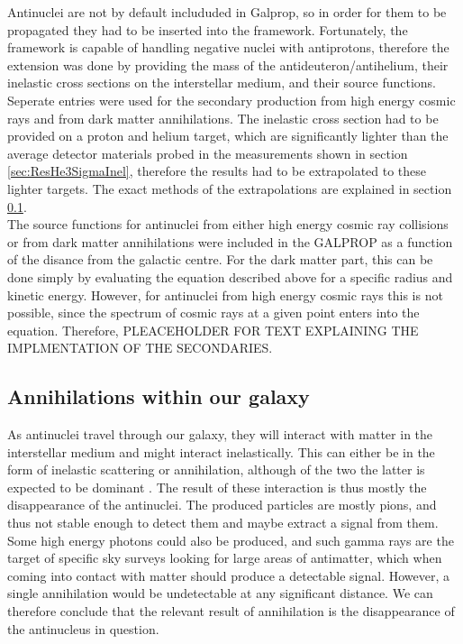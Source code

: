Antinuclei are not by default includuded in Galprop, so in order for them to be propagated they had to be inserted into the framework. Fortunately, the framework is capable of handling negative nuclei with antiprotons, therefore the extension was done by providing the mass of the antideuteron/antihelium, their inelastic cross sections on the interstellar medium, and their source functions. Seperate entries were used for the secondary production from high energy cosmic rays and from dark matter annihilations. The inelastic cross section had to be provided on a proton and helium target, which are significantly lighter than the average detector materials probed in the measurements shown in section \ref{sec:ResHe3SigmaInel}, therefore the results had to be extrapolated to these lighter targets. The exact methods of the extrapolations are explained in section \ref{sec:ResAnnInOurGalaxy}.\\

The source functions for antinuclei from either high energy cosmic ray collisions or from dark matter annihilations were included in the GALPROP as a function of the disance from the galactic centre. For the dark matter part, this can be done simply by evaluating the equation described above for a specific radius and kinetic energy. However, for antinuclei from high energy cosmic rays this is not possible, since the spectrum of cosmic rays at a given point enters into the equation. Therefore, PLEACEHOLDER FOR TEXT EXPLAINING THE IMPLMENTATION OF THE SECONDARIES.

\subsection{Annihilations within our galaxy}\label{sec:ResAnnInOurGalaxy}
As antinuclei travel through our galaxy, they will interact with matter in the interstellar medium and might interact inelastically. This can either be in the form of inelastic scattering or annihilation, although of the two the latter is expected to be dominant \cite{}. The result of these interaction is thus mostly the disappearance of the antinuclei. The produced particles are mostly pions, and thus not stable enough to detect them and maybe extract a signal from them. Some high energy photons could also be produced, and such gamma rays are the target of specific sky surveys looking for large areas of antimatter, which when coming into contact with matter should produce a detectable signal. However, a single annihilation would be undetectable at any significant distance. We can therefore conclude that the relevant result of annihilation is the disappearance of the antinucleus in question. \\


